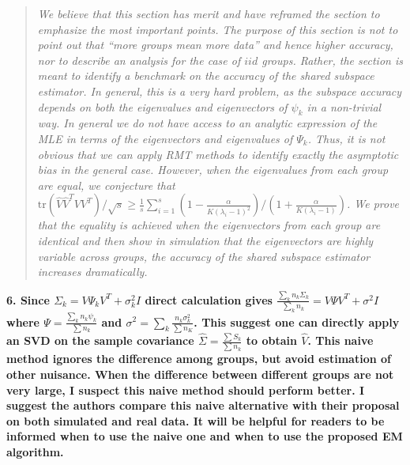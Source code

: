 \documentclass{article}
\newcommand{\tr}{\text{tr}}
\newenvironment{resp}{\begin{quotation}\noindent\slshape}{\end{quotation}}
\begin{document}
\begin{resp}
  We believe that this section has merit and have reframed the section to emphasize the most important points.  The purpose of this section is not to point out that ``more groups mean more data'' and hence higher accuracy, nor to describe an analysis for the case of $iid$ groups.  Rather, the section is meant to identify a benchmark on the accuracy of the shared subspace estimator.  In general, this is a very hard problem, as the subspace accuracy depends on both the eigenvalues and eigenvectors of $\psi_k$ in a non-trivial way.  In general we do not have access to an analytic expression of the MLE in terms of the eigenvectors and eigenvalues of $\Psi_k$.  Thus, it is not obvious that we can apply RMT methods to identify exactly the asymptotic bias in the general case.  However, when the eigenvalues from each group are equal, we conjecture that $\tr(\hat{V}\hat{V}^TVV^T)/\sqrt{s} \geq \frac{1}{s}\sum_{i=1}^s  \left(1-\frac{\alpha}{K(\lambda_i - 1)^2}\right) /\left(1 +
    \frac{\alpha}{K(\lambda_i - 1)}\right)$.  We prove that the equality is achieved when the eigenvectors from each group are identical and then show in simulation that the eigenvectors are highly variable across groups, the accuracy of the shared subspace estimator increases dramatically.  


\end{resp}

\noindent \textbf{6. Since $\Sigma_k = V\Psi_kV^T + \sigma^2_kI$ direct calculation gives
$\frac{\sum_k n_k\Sigma_k}{\sum_k n_k} = V\Psi V^T + \sigma^2I$ where $\Psi = \frac{\sum_k n_k \psi_k}{\sum n_k}$ and $\sigma^2 = \sum_k \frac{n_k \sigma_k^2}{\sum n_K}$.  This suggest one can directly apply an SVD on the sample covariance $\hat{\Sigma} = \frac{\sum S_k}{\sum n_k}$ to obtain $\hat{V}$. This naive method ignores the difference among groups, but avoid estimation of other nuisance. When the difference between different groups are not very large, I suspect this naive method should perform better. I suggest the authors compare this naive alternative with their proposal on both simulated and real data.  It will be helpful for readers to be informed when to use the naive one and when to use the proposed EM algorithm.}
\end{document}
